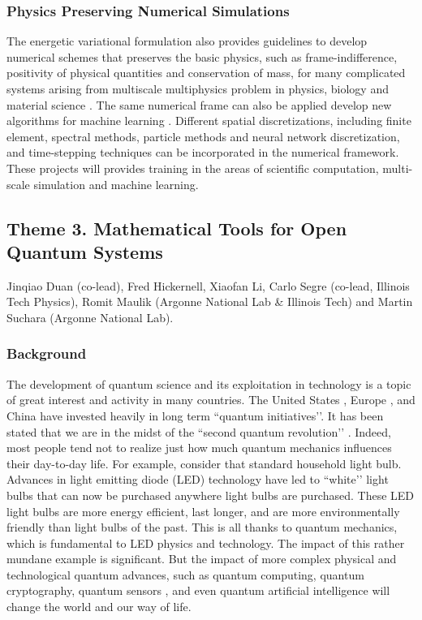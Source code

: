 \documentclass[11pt]{NSFamsart}
\begin{document}
\subsubsection*{Physics Preserving Numerical Simulations}
The energetic variational formulation also provides guidelines to develop numerical schemes that preserves the basic physics, such as frame-indifference, positivity of physical quantities  and conservation of mass, for many complicated systems arising from multiscale multiphysics problem in physics, biology and material science \cite{liu2020variational, liu2020lagrangian, liu2020structure}. The same numerical frame can also be applied develop new algorithms for machine learning \cite{wang2020particle}. Different spatial discretizations, including finite element, spectral methods, particle methods and neural network discretization, and time-stepping techniques can be incorporated in the numerical framework. These projects will provides training in the areas of scientific computation, multi-scale simulation and machine learning.



\subsection*{Theme 3. Mathematical Tools for Open Quantum Systems}
Jinqiao Duan (co-lead), Fred Hickernell, Xiaofan Li,  Carlo Segre (co-lead, Illinois Tech Physics), Romit Maulik (Argonne National Lab \& Illinois Tech) and Martin Suchara (Argonne National Lab).

\subsubsection*{Background} The development of quantum science and its exploitation in technology is a topic of great interest and activity in many countries. The United States \cite{raymer2019us}, Europe \cite{riedel2019europe}, and China \cite{kania2018quantum} have invested heavily in long term ``quantum initiatives’’.  It has been stated that we are in the midst of the ``second quantum revolution’’ \cite{kania2018quantum}. Indeed,  most people tend not to realize just how much quantum mechanics influences their day-to-day life. For example, consider that standard household light bulb. Advances in light emitting diode (LED) technology have led to ``white’’ light bulbs that can now be purchased anywhere light bulbs are purchased. These LED light bulbs are more energy efficient, last longer, and are more environmentally friendly than light bulbs of the past. This is all thanks to quantum mechanics, which is fundamental to LED physics and technology. The impact of this rather mundane example is significant. But the impact of more complex physical and technological quantum advances, such as quantum computing, quantum cryptography, quantum sensors \cite{ng2020guest}, and even quantum artificial intelligence \cite{taylor2020quantum} will change the world and our way of life.
\end{document}
